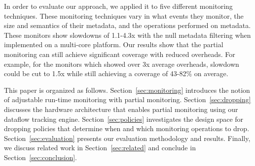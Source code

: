 
In order to evaluate our approach, we applied it to five different monitoring
techniques. These monitoring techniques vary in what events they monitor, the
size and semantics of their metadata, and the operations performed on metadata.
These monitors show slowdowns of 1.1-4.3x with the null metadata filtering when
implemented on a multi-core platform.
Our results show that the partial monitoring can still achieve significant
coverage with reduced overheads. For example, for the monitors which showed over 3x
average overheads, slowdown could be cut to 1.5x while still achieving a
coverage of 43-82\% on average.

This paper is organized as follows. Section~\ref{sec:monitoring} introduces the notion
of adjustable run-time monitoring with partial monitoring.
Section~\ref{sec:dropping} discusses the hardware architecture that enables 
partial monitoring using our dataflow tracking engine.
Section~\ref{sec:policies}
investigates the design space for dropping policies that determine when and which
monitoring operations to drop.
Section~\ref{sec:evaluation} presents our evaluation methodology and
results. Finally, we discuss related work in Section~\ref{sec:related} and
conclude in Section~\ref{sec:conclusion}.

